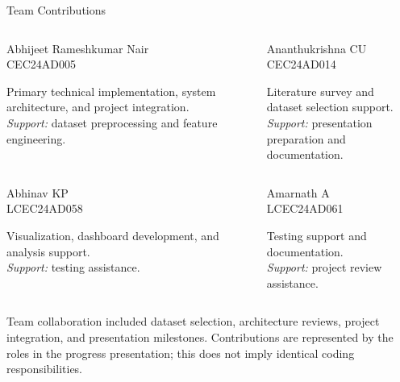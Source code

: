 \documentclass[aspectratio=169,11pt]{beamer}
\begin{document}
\begin{frame}[t]{Team Contributions}
\vspace{1mm}
\footnotesize

\begin{columns}[T,onlytextwidth]
\begin{block}{Abhijeet Rameshkumar Nair\\\scriptsize CEC24AD005}
\begin{minipage}[t][1.5cm][t]{\linewidth}
Primary technical implementation, system architecture, and project integration.\\
\textit{Support:} dataset preprocessing and feature \\engineering.
\end{minipage}
\end{block}
\begin{block}{Ananthukrishna CU\\\scriptsize CEC24AD014}
\begin{minipage}[t][1.5cm][t]{\linewidth}
Literature survey and dataset selection support.\\
\textit{Support:} presentation preparation and \\documentation.
\end{minipage}
\end{block}
\end{columns}

\vspace{3mm}

\begin{columns}[T,onlytextwidth]
\begin{block}{Abhinav KP\\\scriptsize LCEC24AD058}
\begin{minipage}[t][1.5cm][t]{\linewidth}
Visualization, dashboard development, and analysis support.\\
\textit{Support:} testing assistance.
\end{minipage}
\end{block}
\begin{block}{Amarnath A\\\scriptsize LCEC24AD061}
\begin{minipage}[t][1.5cm][t]{\linewidth}
Testing support and documentation.\\
\textit{Support:} project review assistance.
\end{minipage}
\end{block}
\end{columns}

\vfill
{\tiny Team collaboration included dataset selection, architecture reviews, project integration, and presentation milestones. Contributions are represented by the roles in the progress presentation; this does not imply identical coding responsibilities.}
\vspace{1mm}
\end{frame}
\end{document}
